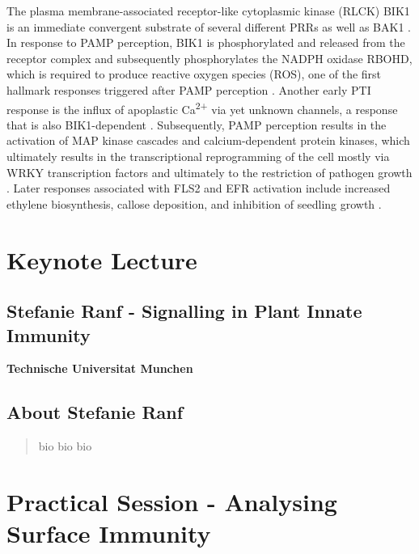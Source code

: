\documentclass[12pt,]{book}
\theoremstyle{definition}
\theoremstyle{definition}
\theoremstyle{remark}
\begin{document}
The plasma membrane-associated receptor-like cytoplasmic kinase (RLCK)
BIK1 is an immediate convergent substrate of several different PRRs as
well as BAK1 \citep{Couto:2016kq}. In response to PAMP perception, BIK1
is phosphorylated and released from the receptor complex and
subsequently phosphorylates the NADPH oxidase RBOHD, which is required
to produce reactive oxygen species (ROS), one of the first hallmark
responses triggered after PAMP perception
\citep{Kadota:2014bi, Li:2014dx}. Another early PTI response is the
influx of apoplastic Ca\textsuperscript{2+} via yet unknown channels, a
response that is also BIK1-dependent
\citep{Li:2014dx, Ranf:2014fg, Seybold:2014wt}. Subsequently, PAMP
perception results in the activation of MAP kinase cascades and
calcium-dependent protein kinases, which ultimately results in the
transcriptional reprogramming of the cell mostly via WRKY transcription
factors and ultimately to the restriction of pathogen growth
\citep{Couto:2016kq}. Later responses associated with FLS2 and EFR
activation include increased ethylene biosynthesis, callose deposition,
and inhibition of seedling growth \citep{Boller:2009hu}.

\section*{Keynote Lecture}\label{keynote-lecture-3}

\subsection*{Stefanie Ranf - Signalling in Plant Innate
Immunity}\label{stefanie-ranf---signalling-in-plant-innate-immunity}

\textbf{Technische Universitat Munchen}

\subsection*{About Stefanie Ranf}\label{about-stefanie-ranf}

\begin{quote}
bio bio bio
\end{quote}

\section*{Practical Session - Analysing Surface
Immunity}\label{practical-session---analysing-surface-immunity}
\end{document}
